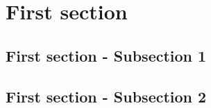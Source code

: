 \section{First section} \label{sec1:title}
\lipsum[1]

\subsection{First section - Subsection 1}
\lipsum[1-3]

\subsection{First section - Subsection 2}
\lipsum[1]

